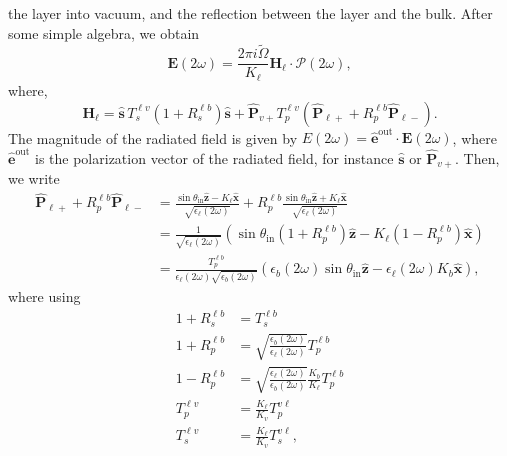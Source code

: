 the layer into vacuum, and the reflection between the layer and the bulk. After
some simple algebra, we obtain
\begin{equation*}\label{r8}
\mathbf{E}(2\omega) = \frac{2\pi i\tilde{\Omega}}{K_{\ell}}
\mathbf{H}_{\ell}\cdot\boldsymbol{\mathcal{P}}(2\omega),
\end{equation*}
where,
\begin{equation}\label{r9}
\mathbf{H}_{\ell}
= \hat{\mathbf{s}}\,T_s^{\ell v}\left(1+R_s^{\ell b}\right)\hat{\mathbf{s}}
+ \hat{\mathbf{P}}_{v+}T_{p}^{\ell v}
\left(
\hat{\mathbf{P}}_{\ell +} +R_{p}^{\ell b}\hat{\mathbf{P}}_{\ell -}
\right). 
\end{equation}
The magnitude of the radiated field is given by
$E(2\omega)=\hat{\mathbf{e}}^{\mathrm{out}}\cdot\mathbf{E}(2\omega)$, where
$\hat{\mathbf{e}}^{\mathrm{out}}$ is the polarization vector of the radiated
field, for instance $\hat{\mathbf{s}}$ or $\hat{\mathbf{P}}_{v+}$. Then, we
write
\begin{equation*}\label{m1}
\begin{split}
\hat{\mathbf{P}}_{\ell +} + R_{p}^{\ell b}\hat{\mathbf{P}}_{\ell -}
&= \frac{\sin\theta_{\mathrm{in}}\hat{\mathbf{z}} - K_{\ell}\hat{\mathbf{x}}}
        {\sqrt{\epsilon_{\ell}(2\omega)}}
 + R_{p}^{\ell b}
   \frac{\sin\theta_{\mathrm{in}}\hat{\mathbf{z}} + K_{\ell}\hat{\mathbf{x}}}
        {\sqrt{\epsilon_{\ell}(2\omega)}}
\\\nonumber
&= \frac{1}{\sqrt{\epsilon_{\ell}(2\omega)}}
\left(
\sin\theta_{\mathrm{in}}(1+R^{\ell b}_{p})\hat{\mathbf{z}}
- K_{\ell}(1-R^{\ell b}_{p})\hat{\mathbf{x}} 
\right)
\\\nonumber 
&= \frac{T^{\ell b}_{p}}{\epsilon_{\ell}(2\omega)\sqrt{\epsilon_{b}(2\omega)}}
\left(
  \epsilon_{b}(2\omega)\sin\theta_{\mathrm{in}}\hat{\mathbf{z}} 
- \epsilon_{\ell}(2\omega)K_{b}\hat{\mathbf{x}}
\right)
,
\end{split}
\end{equation*}
where using
\begin{align}
1 + R^{\ell b}_{s} &= T^{\ell b}_{s}\nonumber\\
1 + R^{\ell b}_{p}
&= \sqrt{\frac{\epsilon_{b}(2\omega)}{\epsilon_{\ell}(2\omega)}}T^{\ell b}_{p} 
\nonumber\\
1 - R^{\ell b}_{p}
&= \sqrt{\frac{\epsilon_{\ell}(2\omega)}{\epsilon_{b}(2\omega)}}
   \frac{K_{b}}{K_{\ell}}T^{\ell b}_{p}\\
T^{\ell v}_{p} &= \frac{K_{\ell}}{K_{v}}T^{v\ell}_{p}\nonumber\\
T^{\ell v}_{s} &= \frac{K_{\ell}}{K_{v}}T^{v\ell}_{s}\nonumber
,
\end{align}
